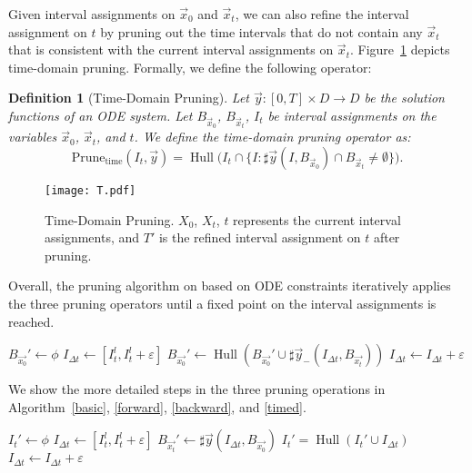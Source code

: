 \documentclass[12pt]{article}
\newtheorem{definition}[theorem]{Definition}
\newcommand{\prunebwd}{\mathrm{Prune}_{\mathrm{bwd}}}
\newcommand{\prunetime}{\mathrm{Prune}_{\mathrm{time}}}
\newcommand{\BXt}{\ensuremath{B_{\vec{x_t}}}}
\newcommand{\BXz}{\ensuremath{B_{\vec{x_0}}}}
\DeclareMathOperator{\Hull}{Hull}
\begin{document}
 Given interval assignments on $\vec x_0$ and $\vec x_t$, we can also refine the interval assignment on $t$ by pruning out the time intervals that do not contain any $\vec x_t$ that is consistent with the current interval assignments on $\vec x_t$. Figure~\ref{tp} depicts time-domain pruning. Formally, we define the following operator:
\begin{definition}[Time-Domain Pruning]
Let $\vec y:[0,T]\times D\rightarrow D$ be the solution functions of an ODE system. Let $B_{\vec x_0}$, $B_{\vec x_t}$, $I_{t}$ be interval assignments on the variables $\vec x_0$, $\vec x_t$, and $t$. We define the time-domain pruning operator as:
$$\mathrm{Prune}_{\mathrm{time}}(I_{t}, \vec y) =\Hull\Big(I_{t}\cap \{I : \sharp \vec y(I, B_{\vec x_0})\cap  B_{\vec x_t} \not= \emptyset\}\Big).$$

\end{definition}
\begin{figure}
\begin{center}
\texttt{[image: T.pdf]}
\end{center}
\caption{Time-Domain Pruning.
 $X_0$, $X_t$, $t$ represents the current interval assignments, and $T'$ is the refined interval assignment on $t$ after pruning.
}\label{tp}
\end{figure}

Overall, the pruning algorithm on based on ODE constraints iteratively applies the three pruning operators until a fixed point on the interval assignments is reached.


\begin{algorithm}\label{alg:BackwardP}
\caption{$\prunebwd(\sharp{\vec{y}}, \BXz, \BXt, I_t)$}\label{backward}
\begin{algorithmic}[1]
  \State $\BXz' \gets \phi$
  \State ${{I_{{\Delta}t}}} \gets [I_t^l, I_t^l + {\varepsilon}]$
      \State $\BXz' \gets \Hull(\BXz' \cup \sharp{\vec{y}_{-}}({{I_{{\Delta}t}}}, \BXt))$
      \State ${{I_{{\Delta}t}}} \gets {I_{{\Delta}t}} + {\varepsilon}$
  \EndWhile
  \State \Return{$\BXz \cap \BXz'$}
\end{algorithmic}
\end{algorithm}

We show the more detailed steps in the three pruning operations in Algorithm~\ref{basic}, \ref{forward}, \ref{backward}, and \ref{timed}.

\begin{algorithm}\label{alg:I_timeP}
\caption{$\prunetime(\sharp{\vec{y}}, \BXz, \BXt, I_t)$}\label{timed}
\begin{algorithmic}[1]
  \State $I_t' \gets \phi$
  \State $I_{{\Delta}t} \gets [I_t^l, I_t^l + {\varepsilon}]$
      \State $\BXt' \gets \sharp{\vec{y}}({{I_{{\Delta}t}}}, \BXz)$
      \If{$\BXt' \cap \BXt \not = \phi$}
          \State $I_t' = \Hull(I_t' \cup {{I_{{\Delta}t}}})$
      \Else
          \State $I_{{\Delta}t} \gets I_{{\Delta}t} + {\varepsilon}$
      \EndIf
  \EndWhile
  \State {}
\end{algorithmic}
\end{algorithm}
\end{document}
